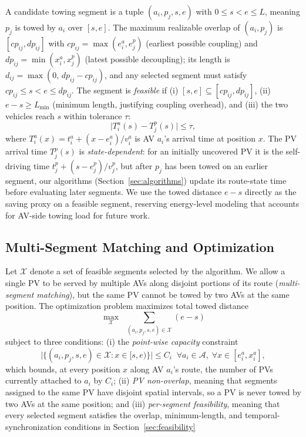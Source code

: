 \documentclass[sigconf]{acmart}
\begin{document}
A candidate towing segment is a tuple $(a_i, p_j, s, e)$ with $0\!\le\! s\!<\!e\!\le\!L$, meaning $p_j$ is towed by $a_i$ over $[s,e]$. The maximum realizable overlap of $(a_i,p_j)$ is $[cp_{ij}, dp_{ij}]$ with $cp_{ij}=\max(e^a_i,e^p_j)$ (earliest possible coupling) and $dp_{ij}=\min(x^a_i,x^p_j)$ (latest possible decoupling); its length is $d_{ij}=\max(0,\,dp_{ij}-cp_{ij})$, and any selected segment must satisfy $cp_{ij}\le s<e\le dp_{ij}$. The segment is \emph{feasible} if (i) $[s,e]\subseteq[cp_{ij},dp_{ij}]$, (ii) $e\!-\!s\ge L_{\min}$ (minimum length, justifying coupling overhead), and (iii) the two vehicles reach $s$ within tolerance $\tau$:
\begin{equation}
\bigl| T^a_i(s) - T^p_j(s) \bigr| \le \tau,
\label{eq:time}
\end{equation}
where $T^a_i(x) = t^a_i + (x - e^a_i)/v^a_i$ is AV $a_i$'s arrival time at position $x$. The PV arrival time $T^p_j(s)$ is \emph{state-dependent}: for an initially uncovered PV it is the self-driving time $t^p_j + (s - e^p_j)/v^p_j$, but after $p_j$ has been towed on an earlier segment, our algorithms (Section~\ref{sec:algorithms}) update its route-state time before evaluating later segments. We use the towed distance $e-s$ directly as the saving proxy on a feasible segment, reserving energy-level modeling that accounts for AV-side towing load for future work.

\subsection{Multi-Segment Matching and Optimization}
\label{sec:opt}

Let $\mathcal{X}$ denote a set of feasible segments selected by the algorithm. We allow a single PV to be served by multiple AVs along disjoint portions of its route (\emph{multi-segment matching}), but the same PV cannot be towed by two AVs at the same position. The optimization problem maximizes total towed distance
\begin{equation}
\max_{\mathcal{X}} \;\; \sum_{(a_i,p_j,s,e)\in\mathcal{X}} (e-s)
\label{eq:obj}
\end{equation}
subject to three conditions: (i) the \emph{point-wise capacity} constraint
\begin{equation}
\bigl|\{(a_i,p_j,s,e)\in\mathcal{X} : x\in[s,e)\}\bigr|\le C_i \;\; \forall a_i\!\in\!\mathcal{A},\; \forall x\!\in\![e^a_i,x^a_i],
\label{eq:capacity}
\end{equation}
which bounds, at every position $x$ along AV $a_i$'s route, the number of PVs currently attached to $a_i$ by $C_i$; (ii) \emph{PV non-overlap}, meaning that segments assigned to the same PV have disjoint spatial intervals, so a PV is never towed by two AVs at the same position; and (iii) \emph{per-segment feasibility}, meaning that every selected segment satisfies the overlap, minimum-length, and temporal-synchronization conditions in Section~\ref{sec:feasibility} 
\end{document}
